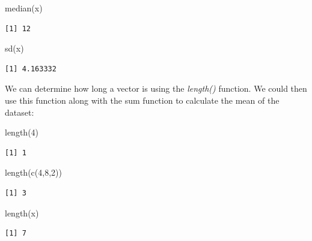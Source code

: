 \documentclass[
  letterpaper,
  DIV=11,
  numbers=noendperiod]{scrreprt}
\newenvironment{Shaded}{\begin{snugshade}}{\end{snugshade}}
\newcommand{\DecValTok}[1]{\textcolor[rgb]{0.68,0.00,0.00}{#1}}
\newcommand{\FunctionTok}[1]{\textcolor[rgb]{0.28,0.35,0.67}{#1}}
\newcommand{\NormalTok}[1]{\textcolor[rgb]{0.00,0.23,0.31}{#1}}
\begin{document}
\begin{Shaded}
\begin{Highlighting}[]
\FunctionTok{median}\NormalTok{(x)}
\end{Highlighting}
\end{Shaded}

\begin{verbatim}
[1] 12
\end{verbatim}

\begin{Shaded}
\begin{Highlighting}[]
\FunctionTok{sd}\NormalTok{(x)}
\end{Highlighting}
\end{Shaded}

\begin{verbatim}
[1] 4.163332
\end{verbatim}

We can determine how long a vector is using the \textit{length()}
function. We could then use this function along with the sum function to
calculate the mean of the dataset:

\begin{Shaded}
\begin{Highlighting}[]
\FunctionTok{length}\NormalTok{(}\DecValTok{4}\NormalTok{)}
\end{Highlighting}
\end{Shaded}

\begin{verbatim}
[1] 1
\end{verbatim}

\begin{Shaded}
\begin{Highlighting}[]
\FunctionTok{length}\NormalTok{(}\FunctionTok{c}\NormalTok{(}\DecValTok{4}\NormalTok{,}\DecValTok{8}\NormalTok{,}\DecValTok{2}\NormalTok{))}
\end{Highlighting}
\end{Shaded}

\begin{verbatim}
[1] 3
\end{verbatim}

\begin{Shaded}
\begin{Highlighting}[]
\FunctionTok{length}\NormalTok{(x)}
\end{Highlighting}
\end{Shaded}

\begin{verbatim}
[1] 7
\end{verbatim}
\end{document}
